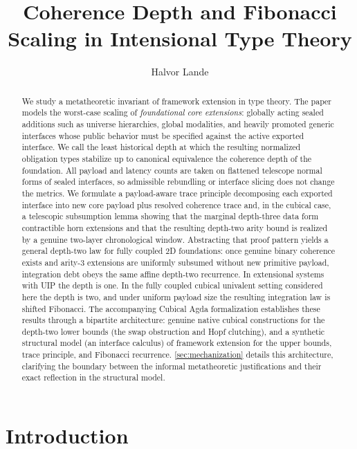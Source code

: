 \documentclass{lmcs}
\title[Coherence Depth and Fibonacci Scaling]{Coherence Depth and Fibonacci Scaling in Intensional Type Theory}
\author[H.\ Lande]{Halvor Lande}
\begin{document}
\begin{abstract}
We study a metatheoretic invariant of framework extension in type theory. The paper models the worst-case scaling of \emph{foundational core extensions}: globally acting sealed additions such as universe hierarchies, global modalities, and heavily promoted generic interfaces whose public behavior must be specified against the active exported interface. We call the least historical depth at which the resulting normalized obligation types stabilize up to canonical equivalence the coherence depth of the foundation. All payload and latency counts are taken on flattened telescope normal forms of sealed interfaces, so admissible rebundling or interface slicing does not change the metrics. We formulate a payload-aware trace principle decomposing each exported interface into new core payload plus resolved coherence trace and, in the cubical case, a telescopic subsumption lemma showing that the marginal depth-three data form contractible horn extensions and that the resulting depth-two arity bound is realized by a genuine two-layer chronological window. Abstracting that proof pattern yields a general depth-two law for fully coupled $2$D foundations: once genuine binary coherence exists and arity-$3$ extensions are uniformly subsumed without new primitive payload, integration debt obeys the same affine depth-two recurrence. In extensional systems with UIP the depth is one. In the fully coupled cubical univalent setting considered here the depth is two, and under uniform payload size the resulting integration law is shifted Fibonacci. The accompanying Cubical Agda formalization establishes these results through a bipartite architecture: genuine native cubical constructions for the depth-two lower bounds (the swap obstruction and Hopf clutching), and a synthetic structural model (an interface calculus) of framework extension for the upper bounds, trace principle, and Fibonacci recurrence. \autoref{sec:mechanization} details this architecture, clarifying the boundary between the informal metatheoretic justifications and their exact reflection in the structural model.
\end{abstract}

\maketitle

\section{Introduction}
\label{sec:introduction}
\end{document}
